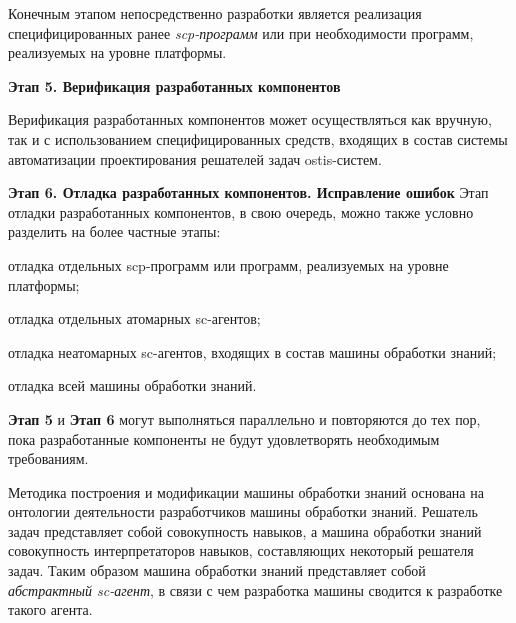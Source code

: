 Конечным этапом непосредственно разработки является реализация специфицированных ранее \textit{scp-программ} или при необходимости программ, реализуемых на уровне платформы.

\textbf{Этап 5. Верификация разработанных компонентов}

Верификация разработанных компонентов может осуществляться как вручную, так и с использованием специфицированных средств, входящих в состав системы автоматизации проектирования решателей задач ostis-систем.

\textbf{Этап 6. Отладка разработанных компонентов. Исправление ошибок}
Этап отладки разработанных компонентов, в свою очередь, можно также условно разделить на более частные этапы:

\begin{textitemize}
    \item отладка отдельных scp-программ или программ, реализуемых на уровне платформы;
    \item отладка отдельных атомарных sc-агентов;
    \item отладка неатомарных sc-агентов, входящих в состав машины обработки знаний;
    \item отладка всей машины обработки знаний.
\end{textitemize}

\textbf{Этап 5} и \textbf{Этап 6} могут выполняться параллельно и повторяются до тех пор, пока разработанные компоненты не будут удовлетворять необходимым требованиям.

Методика построения и модификации машины обработки знаний основана на онтологии деятельности разработчиков машины обработки знаний.
Решатель задач представляет собой совокупность навыков, а машина обработки знаний совокупность интерпретаторов навыков, составляющих некоторый решателя задач. Таким образом машина обработки знаний представляет собой \textit{абстрактный sc-агент}, в связи с чем разработка машины сводится к разработке такого агента.

